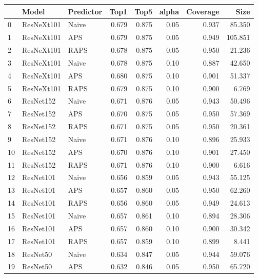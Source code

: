 \begin{tabular}{lllrrrrr}
\toprule
{} &        Model & Predictor &   Top1 &   Top5 &  alpha &  Coverage &     Size \\
\midrule
0  &   ResNeXt101 &     Naive &  0.679 &  0.875 &   0.05 &     0.937 &   85.350 \\
1  &   ResNeXt101 &       APS &  0.679 &  0.875 &   0.05 &     0.949 &  105.851 \\
2  &   ResNeXt101 &      RAPS &  0.678 &  0.875 &   0.05 &     0.950 &   21.236 \\
3  &   ResNeXt101 &     Naive &  0.678 &  0.875 &   0.10 &     0.887 &   42.650 \\
4  &   ResNeXt101 &       APS &  0.680 &  0.875 &   0.10 &     0.901 &   51.337 \\
5  &   ResNeXt101 &      RAPS &  0.679 &  0.875 &   0.10 &     0.900 &    6.769 \\
6  &    ResNet152 &     Naive &  0.671 &  0.876 &   0.05 &     0.943 &   50.496 \\
7  &    ResNet152 &       APS &  0.670 &  0.875 &   0.05 &     0.950 &   57.369 \\
8  &    ResNet152 &      RAPS &  0.671 &  0.875 &   0.05 &     0.950 &   20.361 \\
9  &    ResNet152 &     Naive &  0.671 &  0.876 &   0.10 &     0.896 &   25.933 \\
10 &    ResNet152 &       APS &  0.670 &  0.876 &   0.10 &     0.901 &   27.450 \\
11 &    ResNet152 &      RAPS &  0.671 &  0.876 &   0.10 &     0.900 &    6.616 \\
12 &    ResNet101 &     Naive &  0.656 &  0.859 &   0.05 &     0.943 &   55.125 \\
13 &    ResNet101 &       APS &  0.657 &  0.860 &   0.05 &     0.950 &   62.260 \\
14 &    ResNet101 &      RAPS &  0.656 &  0.860 &   0.05 &     0.949 &   24.613 \\
15 &    ResNet101 &     Naive &  0.657 &  0.861 &   0.10 &     0.894 &   28.306 \\
16 &    ResNet101 &       APS &  0.657 &  0.860 &   0.10 &     0.900 &   30.342 \\
17 &    ResNet101 &      RAPS &  0.657 &  0.859 &   0.10 &     0.899 &    8.441 \\
18 &     ResNet50 &     Naive &  0.634 &  0.847 &   0.05 &     0.944 &   59.076 \\
19 &     ResNet50 &       APS &  0.632 &  0.846 &   0.05 &     0.950 &   65.720 \\

\end{tabular}
